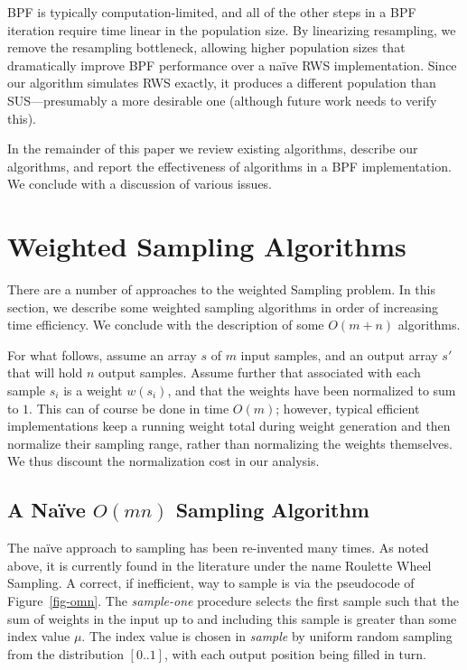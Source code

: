 \documentclass[12pt]{article}
\begin{document}
  BPF is typically computation-limited, and all of the other
  steps in a BPF iteration require time linear in the
  population size.  By linearizing resampling, we remove the
  resampling bottleneck, allowing higher population sizes
  that dramatically improve BPF performance over a na\"ive
  RWS implementation.  Since our algorithm simulates RWS
  exactly, it produces a different population than
  SUS---presumably a more desirable one (although future
  work needs to verify this).

  In the remainder of this paper we review existing
  algorithms, describe our algorithms, and report the
  effectiveness of algorithms in a BPF implementation.  We
  conclude with a discussion of various issues.

\section{Weighted Sampling Algorithms}

  There are a number of approaches to the weighted
  Sampling problem.  In this section, we describe some
  weighted sampling algorithms in order of increasing time
  efficiency.  We conclude with the description of some
  $O(m + n)$ algorithms.

  For what follows, assume an array $s$ of $m$ input
  samples, and an output array $s'$ that will hold $n$
  output samples.  Assume further that associated with each
  sample $s_i$ is a weight $w(s_i)$, and that the weights
  have been normalized to sum to $1$.  This can of course be
  done in time $O(m)$; however, typical efficient
  implementations keep a running weight total during weight
  generation and then normalize their sampling range, rather
  than normalizing the weights themselves.  We thus discount
  the normalization cost in our analysis.

\subsection{A Na\"ive $O(mn)$ Sampling Algorithm}\label{sec-naive}

  The na\"ive approach to sampling has been re-invented
  many times.  As noted above, it is currently found
  in the literature under the name Roulette Wheel Sampling.
  A correct, if inefficient, way to sample is
  via the pseudocode of Figure~\ref{fig-omn}.  The {\em
  sample-one} procedure selects the first sample such that the
  sum of weights in the input up to and including this
  sample is greater than some index value $\mu$.  The index
  value is chosen in {\em sample} by uniform random
  sampling from the distribution $[0..1]$, with each output
  position being filled in turn.
\end{document}

